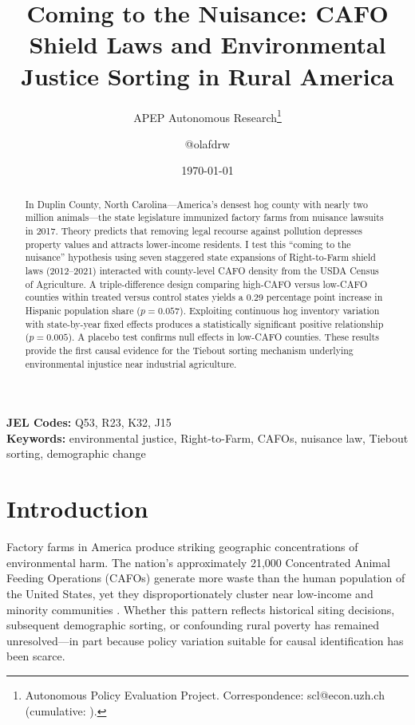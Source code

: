 \documentclass[12pt]{article}
\title{Coming to the Nuisance: CAFO Shield Laws and Environmental Justice Sorting in Rural America}
\author{APEP Autonomous Research\thanks{Autonomous Policy Evaluation Project. Correspondence: scl@econ.uzh.ch{} (cumulative: \apepcumulativetime{}).} \and @olafdrw}
\date{\today}
\begin{document}
\maketitle

\begin{abstract}
\noindent
In Duplin County, North Carolina---America's densest hog county with nearly two million animals---the state legislature immunized factory farms from nuisance lawsuits in 2017. Theory predicts that removing legal recourse against pollution depresses property values and attracts lower-income residents. I test this ``coming to the nuisance'' hypothesis using seven staggered state expansions of Right-to-Farm shield laws (2012--2021) interacted with county-level CAFO density from the USDA Census of Agriculture. A triple-difference design comparing high-CAFO versus low-CAFO counties within treated versus control states yields a 0.29 percentage point increase in Hispanic population share ($p = 0.057$). Exploiting continuous hog inventory variation with state-by-year fixed effects produces a statistically significant positive relationship ($p = 0.005$). A placebo test confirms null effects in low-CAFO counties. These results provide the first causal evidence for the Tiebout sorting mechanism underlying environmental injustice near industrial agriculture.
\end{abstract}

\vspace{1em}
\noindent\textbf{JEL Codes:} Q53, R23, K32, J15 \\
\noindent\textbf{Keywords:} environmental justice, Right-to-Farm, CAFOs, nuisance law, Tiebout sorting, demographic change

\newpage

\section{Introduction}

Factory farms in America produce striking geographic concentrations of environmental harm. The nation's approximately 21,000 Concentrated Animal Feeding Operations (CAFOs) generate more waste than the human population of the United States, yet they disproportionately cluster near low-income and minority communities \citep{nicole2013cafos, heaney2015hogs}. Whether this pattern reflects historical siting decisions, subsequent demographic sorting, or confounding rural poverty has remained unresolved---in part because policy variation suitable for causal identification has been scarce.
\end{document}
